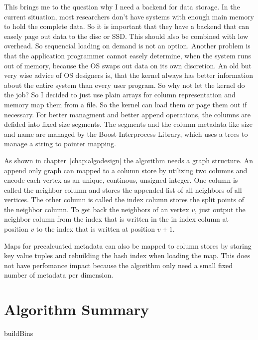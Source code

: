 This brings me to the question why I need a backend for data storage. In the current situation, most researchers don't have systems with enough main memory to hold the complete data. So it is important that they have a backend that can easely page out data to the disc or SSD. This should also be combined with low overhead. So sequencial loading on demand is not an option. Another problem is that the application programmer cannot easely determine, when the system runs out of memory, because the OS swaps out data on its own discretion. An old but very wise advice of OS designers is, that the kernel always has better information about the entire system than every user program. So why not let the kernel do the job? So I decided to just use plain arrays for column representation and memory map them from a file. So the kernel can load them or page them out if necessary. For better managment and better append operations, the columns are defided into fixed size segments. The segments and the column metadata like size and name are managed by the Boost Interprocess Library, which uses a trees to manage a string to pointer mapping.

As shown in chapter~\ref{chap:algodesign} the algorithm needs a graph structure. An append only graph can mapped to a column store by utilizing two columns and encode each vertex as an unique, continous, unsigned integer. One column is called the neighbor column and stores the appended list of all neighbors of all vertices. The other column is called the index column stores the split points of the neighbor column. To get back the neighbors of an vertex $v$, just output the neighbor column from the index that is written in the in index column at position $v$ to the index that is written at position $v+1$.

Maps for precalcuated metadata can also be mapped to column stores by storing key value tuples and rebuilding the hash index when loading the map. This does not have perfomance impact because the algorithm only need a small fixed number of metadata per dimension.

\section{Algorithm Summary}
\begin{algorithm}



	\caption{buildBins}
\end{algorithm}


